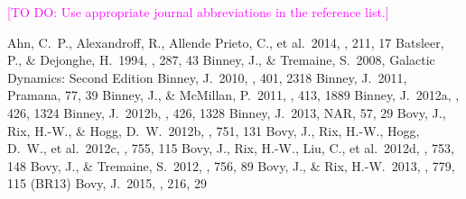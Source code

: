 \documentclass[iop,revtex4]{emulateapj}
\newcommand{\Wilma}[1]{\textcolor{Magenta}{#1}}
\begin{document}
\Wilma{[TO DO: Use appropriate journal abbreviations in the reference list.]}
\begin{thebibliography}{}
 Ahn, C.~P., Alexandroff, R., Allende Prieto, C., et al.\ 2014, \apjs, 211, 17 
 Batsleer, P., \& Dejonghe, H.\ 1994, \aap, 287, 43
 Binney, J., \& Tremaine, S.\ 2008, Galactic Dynamics: Second Edition
 Binney, J.\ 2010, \mnras, 401, 2318
 Binney, J.\ 2011, Pramana, 77, 39
 Binney, J., \& McMillan, P.\ 2011, \mnras, 413, 1889
 Binney, J.\ 2012a, \mnras, 426, 1324
 Binney, J.\ 2012b, \mnras, 426, 1328
 Binney, J.\ 2013, NAR, 57, 29 
 Bovy, J., Rix, H.-W., \& Hogg, D.~W.\ 2012b, \apj, 751, 131
 Bovy, J., Rix, H.-W., Hogg, D.~W., et al.\ 2012c, \apj, 755, 115 
 Bovy, J., Rix, H.-W., Liu, C., et al.\ 2012d, \apj, 753, 148
 Bovy, J., \& Tremaine, S.\ 2012, \apj, 756, 89
 Bovy, J., \& Rix, H.-W.\ 2013, \apj, 779, 115 (BR13)
 Bovy, J.\ 2015, \apjs, 216, 29


\end{thebibliography}
\end{document}
